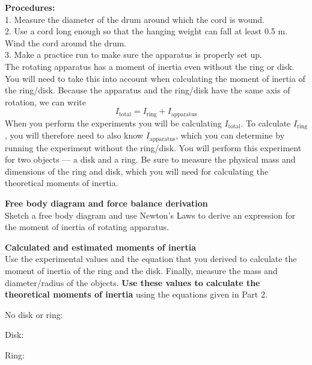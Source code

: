 \documentclass[11pt,letterpaper]{article}
\begin{document}
{\bf Procedures:}\\  
1.  Measure the diameter of the drum around which
the cord is wound.\\
2.  Use a cord long enough so that the hanging weight can fall at least
0.5 m.  Wind the cord around the drum.\\
3.  Make a practice run to make sure the apparatus is properly
set up.\\

The rotating apparatus has a moment of inertia even without the ring or disk. You will need to take this into account when calculating the moment of inertia of the ring/disk. Because the apparatus and the ring/disk have the same axis of rotation, we can write
$$I_{\mbox{total}}=I_{\mbox{ring}}+I_{\mbox{apparatus}}$$
When you perform the experiments you will be calculating $I_{\mbox{total}}$. To calculate $I_{\mbox{ring}}$, you will therefore need to also know $I_{\mbox{apparatus}}$, which you can determine by running the experiment without the ring/disk. You will perform this experiment for two objects --- a disk and a ring.  Be sure to measure the physical mass and dimensions of the ring and disk, which you will need for calculating the theoretical moments of inertia.\bigskip

{\bf Free body diagram and force balance derivation}\\
Sketch a free body diagram and use Newton's Laws to derive an expression for the moment of inertia of rotating apparatus.

\clearpage
{\bf Calculated and estimated moments of inertia}\\
Use the experimental values and the equation that you derived to calculate
the moment of inertia of the ring and the disk.
Finally, measure the mass and diameter/radius of the objects. \textbf{Use these values to calculate the theoretical moments of inertia} using the equations given in Part 2.

No disk or ring:\\
\vspace{6cm}

Disk:\\
\vspace{6cm}

Ring:\\
\vspace{6cm}
\end{document}
